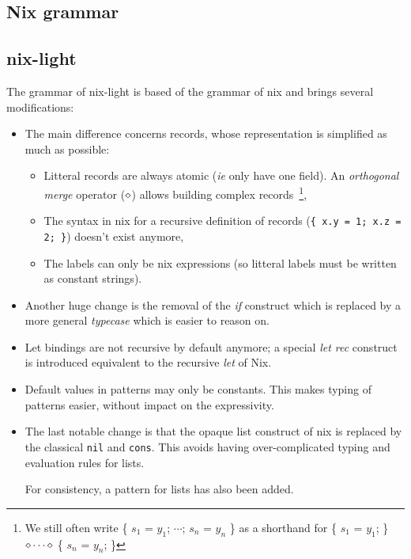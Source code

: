 \subsection{Nix grammar}
\label{sec:nix-grammar}


\subsection{nix-light}
\label{sec:nix-light-grammar}

The grammar of nix-light is based of the grammar of nix and brings several
modifications:
\begin{itemize}
  \item The main difference concerns records, whose representation is simplified as
    much as possible:

    \begin{itemize}
      \item Litteral records are always atomic (\emph{ie} only have one field). An
        \emph{orthogonal merge} operator ($\diamond$) allows building complex
        records~\footnote{We still often write \{ $s_1$ = $y_1$; $\cdots{}$;
        $s_n$ = $y_n$ \} as a shorthand for \{ $s_1$ = $y_1$; \} $\diamond
        \cdots{} \diamond$ \{ $s_n$ = $y_n$; \}},

      \item The syntax in nix for a recursive definition of records (\texttt{\{ x.y
        = 1; x.z = 2; \}}) doesn't exist anymore,

      \item The labels can only be nix expressions (so litteral labels must be
        written as constant strings).
    \end{itemize}

  \item Another huge change is the removal of the \emph{if} construct which is
    replaced by a more general \emph{typecase} which is easier to reason on.

  \item Let bindings are not recursive by default anymore; a special \emph{let
    rec} construct is introduced equivalent to the recursive \emph{let} of Nix.

  \item Default values in patterns may only be constants. This makes typing of
    patterns easier, without impact on the expressivity.

  \item The last notable change is that the opaque list construct of nix is
    replaced by the classical \texttt{nil} and \texttt{cons}.
    This avoids having over-complicated typing and evaluation rules for lists.

    For consistency, a pattern for lists has also been added.
\end{itemize}

